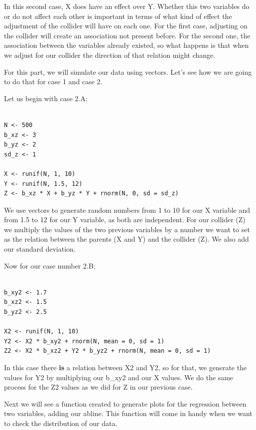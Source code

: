 \documentclass{article}
\begin{document}
In this second case, X does have an effect over Y. Whether this two variables do or do not affect each other is important in terms of what kind of effect the adjustment of the collider will have on each one. For the first case, adjusting on the collider will create an association not present before. For the second one, the association between the variables already existed, so what happens is that when we adjust for our collider the direction of that relation might change. \par
For this part, we will simulate our data using vectors. Let's see how we are going to do that for case 1 and case 2.\par

Let us begin with case 2.A:

\begin{lstlisting}

N <- 500
b_xz <- 3
b_yz <- 2
sd_z <- 1

X <- runif(N, 1, 10)
Y <- runif(N, 1.5, 12)
Z <- b_xz * X + b_yz * Y + rnorm(N, 0, sd = sd_z)

\end{lstlisting}

We use vectors to generate random numbers from 1 to 10 for our X variable and from 1.5 to 12 for our Y variable, as both are independent. For our collider (Z) we multiply the values of the two previous variables by a number we want to set as the relation between the parents (X and Y) and the collider (Z). We also add our standard deviation.\par

Now for our case number 2.B:\par

\begin{lstlisting}

b_xy2 <- 1.7 
b_xz2 <- 1.5
b_yz2 <- 2.5

X2 <- runif(N, 1, 10)
Y2 <- X2 * b_xy2 + rnorm(N, mean = 0, sd = 1)
Z2 <- X2 * b_xz2 + Y2 * b_yz2 + rnorm(N, mean = 0, sd = 1)

\end{lstlisting}

In this case there \textbf{is} a relation between X2 and Y2, so for that, we  generate the values for Y2 by multiplying our b\_xy2 and our X values. We  do the same process for the Z2 values as we did for Z in our previous case.\par

Next we will see a function created to generate plots for the regression between two variables, adding our abline. This function will come in handy when we want to check the distribution of our data.\par
\end{document}
